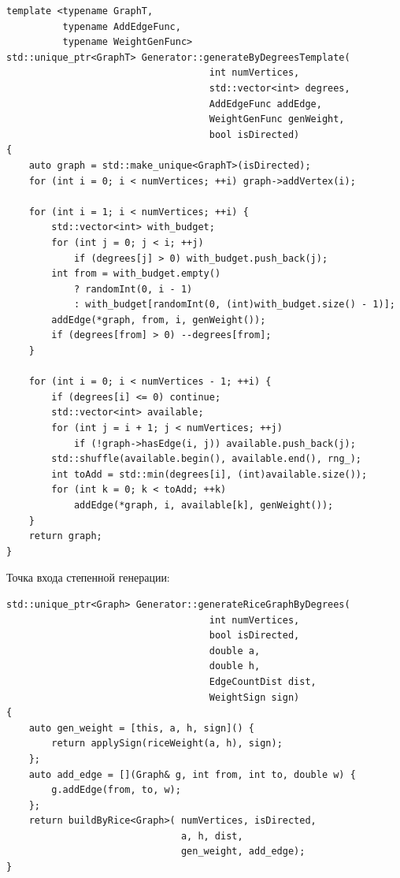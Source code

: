 \begin{lstlisting}[style=cppstyle, caption={Построение графа по целевым степеням (Generator.tpp)}]
template <typename GraphT, 
          typename AddEdgeFunc, 
          typename WeightGenFunc>
std::unique_ptr<GraphT> Generator::generateByDegreesTemplate(
                                    int numVertices, 
                                    std::vector<int> degrees,
                                    AddEdgeFunc addEdge, 
                                    WeightGenFunc genWeight, 
                                    bool isDirected)
{
    auto graph = std::make_unique<GraphT>(isDirected);
    for (int i = 0; i < numVertices; ++i) graph->addVertex(i);

    for (int i = 1; i < numVertices; ++i) {
        std::vector<int> with_budget;
        for (int j = 0; j < i; ++j)
            if (degrees[j] > 0) with_budget.push_back(j);
        int from = with_budget.empty()
            ? randomInt(0, i - 1)
            : with_budget[randomInt(0, (int)with_budget.size() - 1)];
        addEdge(*graph, from, i, genWeight());
        if (degrees[from] > 0) --degrees[from];
    }

    for (int i = 0; i < numVertices - 1; ++i) {
        if (degrees[i] <= 0) continue;
        std::vector<int> available;
        for (int j = i + 1; j < numVertices; ++j)
            if (!graph->hasEdge(i, j)) available.push_back(j);
        std::shuffle(available.begin(), available.end(), rng_);
        int toAdd = std::min(degrees[i], (int)available.size());
        for (int k = 0; k < toAdd; ++k)
            addEdge(*graph, i, available[k], genWeight());
    }
    return graph;
}
\end{lstlisting}

Точка входа степенной генерации:

\begin{lstlisting}[style=cppstyle, caption={generateRiceGraphByDegrees (Generator.cc)}]
std::unique_ptr<Graph> Generator::generateRiceGraphByDegrees(
                                    int numVertices, 
                                    bool isDirected, 
                                    double a, 
                                    double h,
                                    EdgeCountDist dist, 
                                    WeightSign sign)
{
    auto gen_weight = [this, a, h, sign]() {
        return applySign(riceWeight(a, h), sign);
    };
    auto add_edge = [](Graph& g, int from, int to, double w) {
        g.addEdge(from, to, w);
    };
    return buildByRice<Graph>( numVertices, isDirected, 
                               a, h, dist,
                               gen_weight, add_edge);
}
\end{lstlisting}

